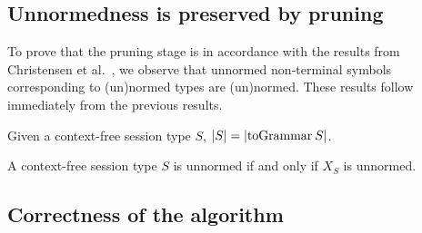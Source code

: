 \subsection{Unnormedness is preserved by pruning}

To prove that the pruning stage is in accordance with the results from
Christensen et al.~\cite{DBLP:journals/iandc/ChristensenHS95}, we
observe that unnormed non-terminal symbols corresponding to (un)normed
types are (un)normed. These results follow immediately from the
previous results. 

\begin{corollary}
  Given a context-free session type $S$, $|S| = |\toGrammarf S|$.
\end{corollary}

\begin{corollary}
  A context-free session type $S$ is unnormed if and only if $X_S$ is
  unnormed.
\end{corollary}


\subsection{Correctness of the algorithm}
%
%
%

